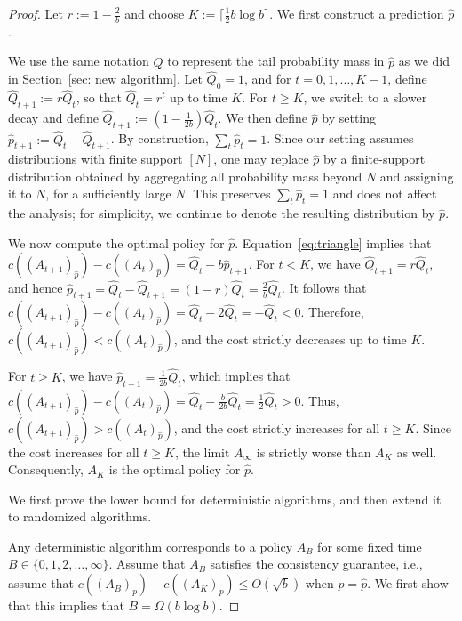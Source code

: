 \NewLowerBound*
\begin{proof}
    Let $r:=1-\tfrac{2}{b}$ and choose $K:=\lceil \tfrac{1}{2} b\log b\rceil$. We first construct a prediction $\hat p$.
    
    We use the same notation $\hat{Q}$ to represent the tail probability mass in $\hat{p}$ as we did in Section~\ref{sec: new algorithm}. Let $\hat Q_0=1$, and for $t=0,1,\dots,K-1$, define $\hat Q_{t+1}:=r\hat Q_t$, so that $\hat Q_t=r^t$ up to time $K$. For $t\ge K$, we switch to a slower decay and define $\hat Q_{t+1}:=(1-\tfrac{1}{2b})\hat Q_t$. We then define $\hat p$ by setting $\hat p_{t+1}:=\hat Q_t-\hat Q_{t+1}$. By construction, $\sum_t \hat p_t=1$.
    Since our setting assumes distributions with finite support $[N]$, one may replace $\hat{p}$ by a finite-support distribution obtained by aggregating all probability mass beyond $N$ and assigning it to $N$, for a sufficiently large $N$. This preserves $\sum_t \hat p_t=1$ and does not affect the analysis; for simplicity, we continue to denote the resulting distribution by $\hat{p}$.

    We now compute the optimal policy for $\hat p$. Equation~\eqref{eq:triangle} implies that $c((A_{t+1})_{\hat p})-c((A_t)_{\hat p})=\hat Q_t-b\hat p_{t+1}$.
    For $t<K$, we have $\hat Q_{t+1}=r\hat Q_t$, and hence $\hat p_{t+1}=\hat Q_t-\hat Q_{t+1}=(1-r)\hat Q_t=\tfrac{2}{b}\hat Q_t$. It follows that $c((A_{t+1})_{\hat p})-c((A_t)_{\hat p})=\hat Q_t-2\hat Q_t=-\hat Q_t<0$. Therefore, $c((A_{t+1})_{\hat p})<c((A_t)_{\hat p})$, and the cost strictly decreases up to time $K$.

    For $t\ge K$, we have $\hat p_{t+1}=\tfrac{1}{2b}\hat Q_t$, which implies that $c((A_{t+1})_{\hat p})-c((A_t)_{\hat p})=\hat Q_t-\tfrac{b}{2b}\hat Q_t=\tfrac{1}{2}\hat Q_t>0$. Thus, $c((A_{t+1})_{\hat p})>c((A_t)_{\hat p})$, and the cost strictly increases for all $t\ge K$. Since the cost increases for all $t\ge K$, the limit $A_{\infty}$ is strictly worse than $A_K$ as well. Consequently, $A_K$ is the optimal policy for $\hat p$.

    
    We first prove the lower bound for deterministic algorithms, and then extend it to randomized algorithms.

    Any deterministic algorithm corresponds to a policy $A_B$ for some fixed time $B\in\{0,1,2,\dots,\infty\}$. Assume that $A_B$ satisfies the consistency guarantee, i.e., assume that $c((A_B)_p)-c((A_K)_p)\leq O(\sqrt b)$ when $p = \hat p$.  We first show that this implies that $B = \Omega(b \log b)$.   
    

\end{proof}
